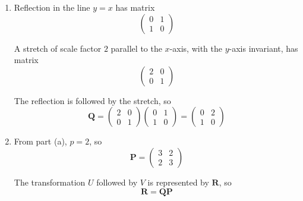 \documentclass[leqno]{article}
\begin{document}
\begin{enumerate}[
  label=\textbf{\arabic*.},
  leftmargin=*,
  topsep=0pt,
  partopsep=0pt,
  parsep=0pt
]
\begin{djsSolution}
\begin{enumerate}[label=\textbf{(\alph*)}]
So either
\[
p^2+2p-3=5
\]

or
\[
p^2+2p-3=-5
\]

From the first:
\begin{align*}
p^2+2p-8&=0\\
(p+4)(p-2)&=0
\end{align*}

so
\[
p=-4 \quad \text{or} \quad p=2
\]

From the second:
\[
p^2+2p+2=0
\]

which has no real solutions.

Since $p$ is positive, the value is
\[
p=2
\]

  \item Reflection in the line $y=x$ has matrix
\[
\begin{pmatrix}0&1\\1&0\end{pmatrix}
\]

A stretch of scale factor $2$ parallel to the $x$-axis, with the $y$-axis invariant, has matrix
\[
\begin{pmatrix}2&0\\0&1\end{pmatrix}
\]

The reflection is followed by the stretch, so
\[
\mathbf Q=
\begin{pmatrix}2&0\\0&1\end{pmatrix}
\begin{pmatrix}0&1\\1&0\end{pmatrix}
=
\begin{pmatrix}0&2\\1&0\end{pmatrix}
\]

  \item From part (a), $p=2$, so
\[
\mathbf P=\begin{pmatrix}3&2\\2&3\end{pmatrix}
\]

The transformation $U$ followed by $V$ is represented by $\mathbf R$, so
\[
\mathbf R=\mathbf Q\mathbf P
\]


\end{enumerate}
\end{djsSolution}
\end{enumerate}
\end{document}
